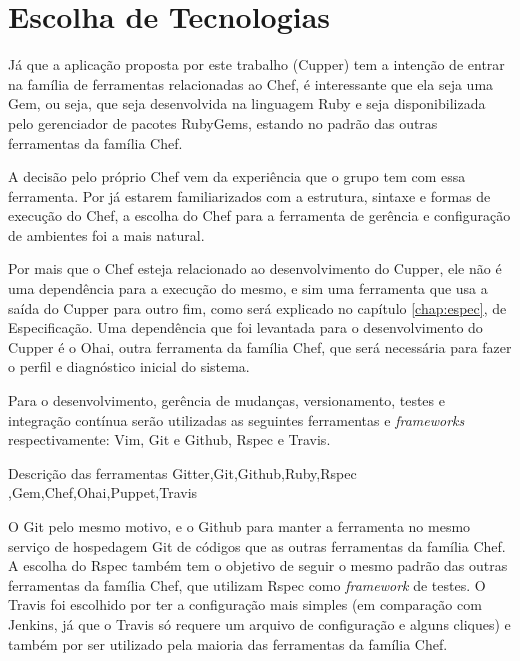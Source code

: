 \section{Escolha de Tecnologias}
\label{sec:tec}

Já que a aplicação proposta por este trabalho (Cupper) tem a intenção de entrar
na família de ferramentas relacionadas ao Chef, é interessante que ela seja uma
Gem, ou seja, que seja desenvolvida na linguagem Ruby e seja disponibilizada pelo
gerenciador de pacotes RubyGems, estando no padrão das outras ferramentas da
família Chef.

A decisão pelo próprio Chef vem da experiência que o grupo tem com essa ferramenta.
Por já estarem familiarizados com a estrutura, sintaxe e formas de execução do Chef,
a escolha do Chef para a ferramenta de gerência e configuração de ambientes foi a
mais natural.

Por mais que o Chef esteja relacionado ao desenvolvimento do Cupper, ele não é uma
dependência para a execução do mesmo, e sim uma ferramenta que usa a saída do Cupper
para outro fim, como será explicado no capítulo \ref{chap:espec}, de Especificação.
Uma dependência que foi levantada para o desenvolvimento do Cupper é o Ohai,
outra ferramenta da família Chef, que será necessária para fazer o perfil e diagnóstico
inicial do sistema.

Para o desenvolvimento, gerência de mudanças, versionamento, testes e integração
contínua serão utilizadas as seguintes ferramentas e \textit{frameworks} respectivamente:
Vim, Git e Github, Rspec e Travis.

{\color{red} Descrição das ferramentas Gitter,Git,Github,Ruby,Rspec
,Gem,Chef,Ohai,Puppet,Travis}

O Git pelo mesmo motivo, e o Github para manter a ferramenta no mesmo serviço de hospedagem
Git de códigos que as outras ferramentas da família Chef. A escolha do Rspec também
tem o objetivo de seguir o mesmo padrão das outras ferramentas da família Chef, que
utilizam Rspec como \textit{framework} de testes. O Travis foi escolhido por ter a
configuração mais simples (em comparação com Jenkins, já que o Travis só requere
um arquivo de configuração e alguns cliques) e também por ser utilizado pela
maioria das ferramentas da família Chef.
